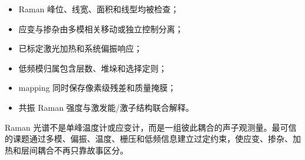 \documentclass[11pt,a4paper,openany,fontset=fandol]{ctexbook}
\newcommand{\tickitem}{\item[$\square$]}
\begin{document}
\begin{checkbox}
\begin{itemize}
\tickitem Raman 峰位、线宽、面积和线型均被检查；
\tickitem 应变与掺杂由多模相关移动或独立控制分离；
\tickitem 已标定激光加热和系统偏振响应；
\tickitem 低频模归属包含层数、堆垛和选择定则；
\tickitem mapping 同时保存像素级残差和质量掩膜；
\tickitem 共振 Raman 强度与激发能/激子结构联合解释。
\end{itemize}
\end{checkbox}

\begin{conclusionbox}
Raman 光谱不是单峰温度计或应变计，而是一组彼此耦合的声子观测量。最可信的课题通过多模、偏振、温度、栅压和低频信息建立过定约束，使应变、掺杂、加热和层间耦合不再只靠故事区分。
\end{conclusionbox}
\end{document}
